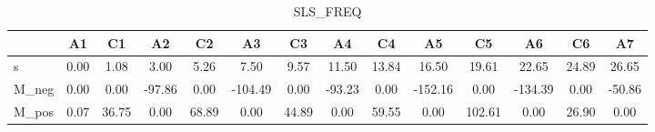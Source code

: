 \begin{table}[H]
\caption{SLS_FREQ}
\begin{tabular}{lSSSSSSSSSSSSS}
\toprule
{} & {A1} & {C1} & {A2} & {C2} & {A3} & {C3} & {A4} & {C4} & {A5} & {C5} & {A6} & {C6} & {A7} \\
\midrule
s & 0.00 & 1.08 & 3.00 & 5.26 & 7.50 & 9.57 & 11.50 & 13.84 & 16.50 & 19.61 & 22.65 & 24.89 & 26.65 \\
M_neg & 0.00 & 0.00 & -97.86 & 0.00 & -104.49 & 0.00 & -93.23 & 0.00 & -152.16 & 0.00 & -134.39 & 0.00 & -50.86 \\
M_pos & 0.07 & 36.75 & 0.00 & 68.89 & 0.00 & 44.89 & 0.00 & 59.55 & 0.00 & 102.61 & 0.00 & 26.90 & 0.00 \\
\bottomrule
\end{tabular}
\end{table}
